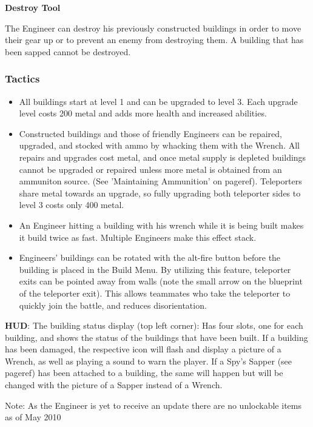 {\bf Destroy Tool}

 The Engineer can destroy his previously constructed buildings in order to move their gear up or to prevent an enemy from destroying them. A building that has been sapped cannot be destroyed.


\subsubsection {Tactics}
\begin {itemize}

\item All buildings start at level 1 and can be upgraded to level 3.  Each upgrade level costs 200 metal and adds more health and increased abilities.

\item Constructed buildings and those of friendly Engineers can be repaired, upgraded, and stocked with ammo by whacking them with the Wrench.  All repairs and upgrades cost metal, and once metal supply is depleted buildings cannot be upgraded or repaired unless more metal is obtained from an ammuniton source.  (See 'Maintaining Ammunition' on {{pageref}}). Teleporters share metal towards an upgrade, so fully upgrading both teleporter sides to level 3 costs only 400 metal.

\item An Engineer hitting a building with his wrench while it is being built makes it build twice as fast. Multiple Engineers make this effect stack.

\item Engineers' buildings can be rotated with the alt-fire button before the building is placed in the Build Menu. By utilizing this feature, teleporter exits can be pointed away from walls (note the small arrow on the blueprint of the teleporter exit). This allows teammates who take the teleporter to quickly join the battle, and reduces disorientation.
\end {itemize}
{\bf HUD}:
The building status display (top left corner): Has four slots, one for each building, and shows the status of the buildings that have been built. If a building has been damaged, the respective icon will  flash and display a picture of a Wrench, as well as playing a sound to warn the player. If a Spy's Sapper (see {{pageref}}) has been attached to a building, the same will happen but will be changed with the picture of a Sapper instead of a Wrench.
 
Note: As the Engineer is yet to receive an update there are no unlockable items as of May 2010 
 